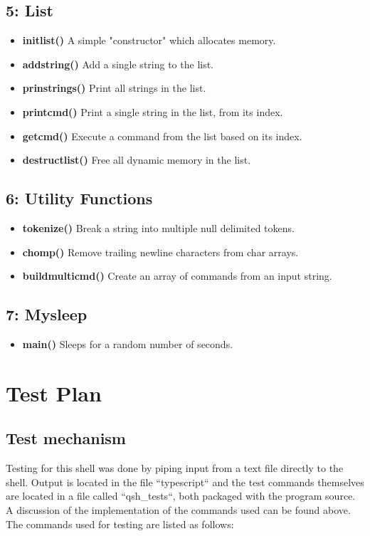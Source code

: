 \documentclass[letter,10pt]{article}
\begin{document}
    \subsection*{5: List}
    \begin{itemize}
        \item \textbf{initlist()}
            A simple "constructor" which allocates memory.
        \item \textbf{addstring()}
            Add a single string to the list.
        \item \textbf{prinstrings()}
            Print all strings in the list.
        \item \textbf{printcmd()}
            Print a single string in the list, from its index.
        \item \textbf{getcmd()}
            Execute a command from the list based on its index.
        \item \textbf{destructlist()}
            Free all dynamic memory in the list.
    \end{itemize}

    \subsection*{6: Utility Functions}
    \begin{itemize}
        \item \textbf{tokenize()}
            Break a string into multiple null delimited tokens.
        \item \textbf{chomp()}
            Remove trailing newline characters from char arrays.
        \item \textbf{buildmulticmd()}
            Create an array of commands from an input string.
    \end{itemize}

    \subsection*{7: Mysleep}
    \begin{itemize}
        \item \textbf{main()}
            Sleeps for a random number of seconds.
    \end{itemize}


\section*{Test Plan}
    \subsection*{Test mechanism}
        Testing for this shell was done by piping input from a text file directly to the shell. Output is located in the file ``typescript`` and the test commands themselves are located in a file called ``qsh\_tests``, both packaged with the program source. A discussion of the implementation of the commands used can be found above. The commands used for testing are listed as follows: \\
\end{document}
